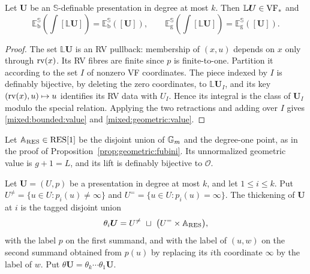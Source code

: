\begin{lem}\label{lem:mixed:lift}
Let $\bm U$ be an $\mathbb S$-definable presentation in degree at most $k$.
Then $\mathbb L\bm U\in\mathrm{VF}_*$ and
\[
 \mathbb E_{\mathrm b}^{\mathbb S}\!\left(\int[\mathbb L\bm U]\right)
   =\mathbb E_{\mathrm b}^{\mathbb S}([\bm U]),
 \qquad
 \mathbb E_{\mathrm g}^{\mathbb S}\!\left(\int[\mathbb L\bm U]\right)
   =\mathbb E_{\mathrm g}^{\mathbb S}([\bm U]).
\]
\end{lem}

\begin{proof}
The set $\mathbb L\bm U$ is an RV pullback: membership of $(x,u)$
depends on $x$ only through $\operatorname{rv}(x)$. Its RV fibres are finite since $p$
is finite-to-one. Partition it according to the set $I$ of nonzero VF
coordinates. The piece indexed by $I$ is definably bijective, by deleting
the zero coordinates, to $\mathbb L\bm U_I$, and its key
$(\operatorname{rv}(x),u)\mapsto u$ identifies its RV data with $U_I$. Hence its integral
is the class of $\bm U_I$ modulo the special relation. Applying the two
retractions and adding over $I$ gives \eqref{mixed:bounded:value} and
\eqref{mixed:geometric:value}.
\end{proof}

Let $\bm{\mathbb A}_{\mathrm{RES}}\in\mathrm{RES}[1]$ be the disjoint union of $\mathbb G_m$ and the
degree-one point, as in the proof of Proposition~\ref{prop:geometric:fubini}.
Its unnormalized geometric value is $g+1=L$, and its lift is definably
bijective to $\mathcal O$.

\begin{defn}\label{defn:thickening}
Let $\bm U=(U,p)$ be a presentation in degree at most $k$, and let
$1\leq i\leq k$. Put $U^{\neq}=\{u\in U:p_i(u)\neq\infty\}$ and
$U^{=}=\{u\in U:p_i(u)=\infty\}$. The thickening of $\bm U$ at $i$ is
the tagged disjoint union
\[
 \theta_i\bm U=U^{\neq}\ \sqcup\ \bigl(U^{=}\times\bm{\mathbb A}_{\mathrm{RES}}\bigr),
\]
with the label $p$ on the first summand, and with the label of $(u,w)$ on
the second summand obtained from $p(u)$ by replacing its $i$th coordinate
$\infty$ by the label of $w$. Put
$\theta\bm U=\theta_k\cdots\theta_1\bm U$.
\end{defn}


